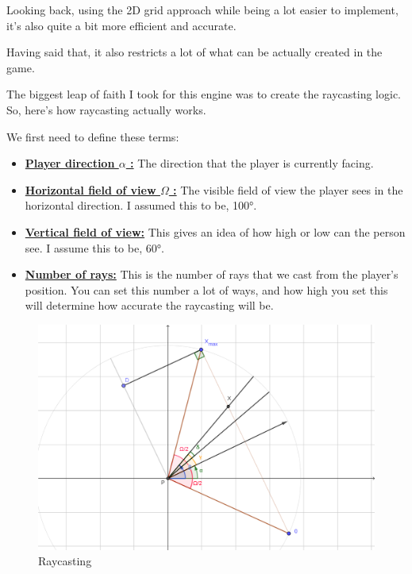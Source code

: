 Looking back, using the 2D grid approach while being a lot easier to implement, it's also quite a bit more efficient and accurate.

Having said that, it also restricts a lot of what can be actually created in the game.


The biggest leap of faith I took for this engine was to create the raycasting logic. So, here's how raycasting actually works.

We first need to define these terms:

\begin{itemize}

    \item \underline{\textbf{Player direction $\alpha$ :}} The direction that the player is currently facing.
    \item \underline{\textbf{Horizontal field of view $\Omega$ :}} The visible field of view the player sees in the horizontal direction. I assumed this to be, 100°.
    \item \underline{\textbf{Vertical field of view:}} This gives an idea of how high or low can the person see. I assume this to be, 60°.
    \item \underline{\textbf{Number of rays:}} This is the number of rays that we cast from the player's position. You can set this number a lot of ways, and how high you set this will determine how accurate the raycasting will be.

\end{itemize}

\begin{figure}[!ht]
    \centering
    \includegraphics[width=\textwidth]{./images/raycasting.png}
    \caption{Raycasting}
    \label{fig:rays}
\end{figure}

\newpage

